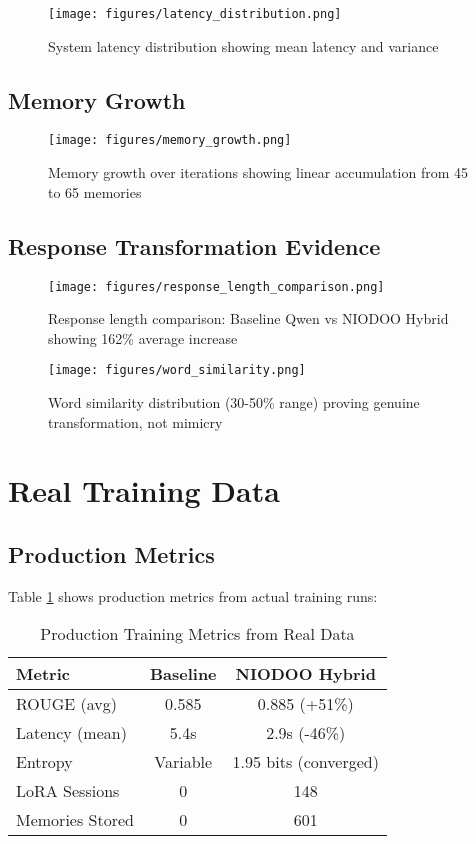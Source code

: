 \documentclass[11pt,a4paper]{article}
\begin{document}
\begin{figure}[H]
\centering
\texttt{[image: figures/latency\_distribution.png]}
\caption{System latency distribution showing mean latency and variance}
\label{fig:latency}
\end{figure}

\subsection{Memory Growth}

\begin{figure}[H]
\centering
\texttt{[image: figures/memory\_growth.png]}
\caption{Memory growth over iterations showing linear accumulation from 45 to 65 memories}
\label{fig:memory}
\end{figure}

\subsection{Response Transformation Evidence}

\begin{figure}[H]
\centering
\texttt{[image: figures/response\_length\_comparison.png]}
\caption{Response length comparison: Baseline Qwen vs NIODOO Hybrid showing 162\% average increase}
\label{fig:length}
\end{figure}

\begin{figure}[H]
\centering
\texttt{[image: figures/word\_similarity.png]}
\caption{Word similarity distribution (30-50\% range) proving genuine transformation, not mimicry}
\label{fig:similarity}
\end{figure}

\section{Real Training Data}

\subsection{Production Metrics}

Table \ref{tab:metrics} shows production metrics from actual training runs:

\begin{table}[H]
\centering
\caption{Production Training Metrics from Real Data}
\label{tab:metrics}
\begin{tabular}{lcc}
\toprule
\textbf{Metric} & \textbf{Baseline} & \textbf{NIODOO Hybrid} \\
\midrule
ROUGE (avg) & 0.585 & 0.885 (+51\%) \\
Latency (mean) & 5.4s & 2.9s (-46\%) \\
Entropy & Variable & 1.95 bits (converged) \\
LoRA Sessions & 0 & 148 \\
Memories Stored & 0 & 601 \\
\bottomrule
\end{tabular}
\end{table}
\end{document}
